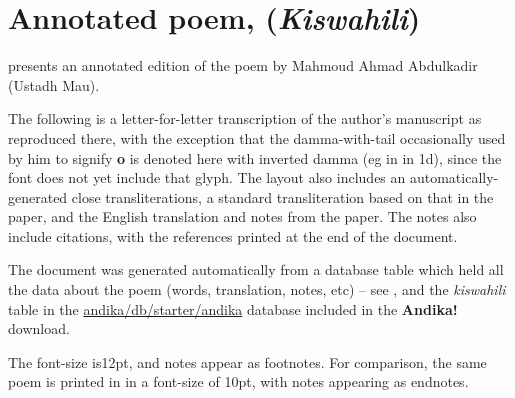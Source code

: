 \chapter{Annotated poem,  (\textit{Kiswahili})}
\renewcommand{\thesection}{D/\arabic{section}}  %
\setcounter{section}{0}  %
\label{appD}

\citet{Abdulkadir2013} presents an annotated edition of the poem  by Mahmoud Ahmad Abdulkadir (Ustadh Mau).

The following is a letter-for-letter transcription of the author's manuscript as reproduced there, with the exception that the damma-with-tail occasionally used by him to signify \textbf{o} is denoted here with inverted damma (eg in  in 1d), since the font does not yet include that glyph.  The layout also includes an automatically-generated close transliterations, a standard transliteration based on that in the paper, and the English translation and notes from the paper.  The notes also include citations, with the references printed at the end of the document.

The document was generated automatically from a database table which held all the data about the poem (words, translation, notes, etc) -- see , and the \textit{kiswahili} table in the \url{andika/db/starter/andika} database included in the \textbf{Andika!} download.

The font-size is12pt, and notes appear as footnotes.  For comparison, the same poem is printed in  in a font-size of 10pt, with notes appearing as endnotes.



